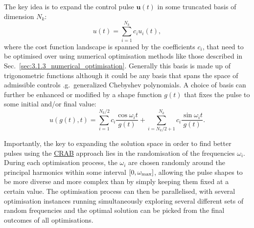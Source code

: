 \documentclass[a4paper,oneside,11pt]{book}
\newcommand{\ubb}{\boldsymbol{u}}
\newcommand{\acrref}[1]{\hyperref[acr:#1]{#1}}
\begin{document}
The key idea is to expand the control pulse $\ubb(t)$ in some truncated basis of dimension $N_k$: 
\begin{equation}\label{eq:basic_CRAB}
    u(t) = \sum_{i = 1}^{N_k} c_i u_i(t),
\end{equation}
where the cost function landscape is spanned by the coefficients $c_i$, that need to be optimised over using numerical optimisation methods like those described in Sec.~\ref{sec:3.1.3_numerical_optimisation}. Generally this basis is made up of trigonometric functions although it could be any basis that spans the space of admissible controls \@e.g.~generalized Chebyshev polynomials. A choice of basis can further be enhanced or modified by a shape function $g(t)$ that fixes the pulse to some initial and/or final value:
\begin{equation}\label{eq:trigonometric_CRAB}
    u(g(t),t) = \sum_{i = 1}^{N_k/2} c_i \frac{\cos{\omega_i t}}{g(t)} + \sum_{i = N_k/2 + 1}^{N_k} c_i \frac{\sin{\omega_i} t}{g(t)}.
\end{equation}

Importantly, the key to expanding the solution space in order to find better pulses using the \acrref{CRAB} approach lies in the randomisation of the frequencies $\omega_i$. During each optimisation process, the $\omega_i$ are chosen randomly around the principal harmonics within some interval $[0, \omega_{\rm max}]$, allowing the pulse shapes to be more diverse and more complex than by simply keeping them fixed at a certain value. The optimisation process can then be parallelised, with several optimisation instances running simultaneously exploring several different sets of random frequencies and the optimal solution can be picked from the final outcomes of all optimisations. 
\end{document}

